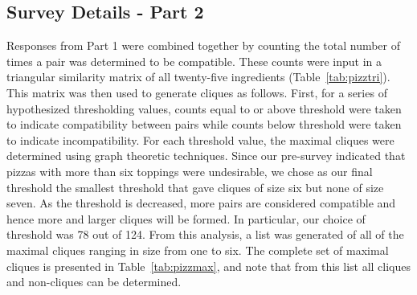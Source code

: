\subsection{Survey Details - Part 2}
Responses from Part 1 were combined together by counting the total number of times a pair was determined to be compatible.  These counts were input in a triangular similarity matrix of all twenty-five ingredients (Table~\ref{tab:pizztri}).  This matrix was then used to generate cliques as follows.  First, for a series of hypothesized thresholding values,  counts equal to or above threshold were taken to indicate compatibility between pairs while counts below threshold were taken to indicate incompatibility.  For each threshold value, the maximal cliques were determined using graph theoretic techniques.  Since our pre-survey indicated that pizzas with more than six toppings were undesirable, we chose as our final threshold the smallest threshold that gave cliques of size six but none of size seven.  As the threshold is decreased, more pairs are considered compatible and hence more and larger cliques will be formed.  In particular, our choice of threshold was 78 out of 124.  From this analysis, a list was generated of all of the maximal cliques  ranging in size from one to six.  The complete set of maximal cliques is presented in Table~\ref{tab:pizzmax}, and note that from this list all cliques and non-cliques can be determined.  




